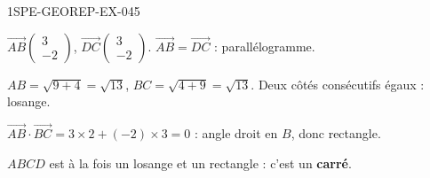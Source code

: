 \begin{corrige}{1SPE-GEOREP-EX-045}

$\vec{AB}\begin{pmatrix} 3 \\ -2 \end{pmatrix}$, $\vec{DC}\begin{pmatrix} 3 \\ -2 \end{pmatrix}$. $\vec{AB} = \vec{DC}$ : parallélogramme.

$AB = \sqrt{9 + 4} = \sqrt{13}$, $BC = \sqrt{4 + 9} = \sqrt{13}$. Deux côtés consécutifs égaux : losange.

$\vec{AB} \cdot \vec{BC} = 3 \times 2 + (-2) \times 3 = 0$ : angle droit en $B$, donc rectangle.

$ABCD$ est à la fois un losange et un rectangle : c'est un \textbf{carré}.

\end{corrige}
